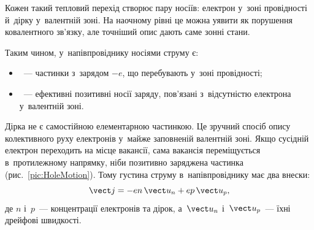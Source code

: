 
Кожен такий тепловий перехід створює пару носіїв: електрон у~зоні провідності й~дірку
у~валентній зоні. На наочному рівні це можна уявити як порушення ковалентного зв'язку,
але точніший опис дають саме зонні стани.

Таким чином, у~напівпровіднику носіями струму є:
\begin{itemize}
	\item {}~--- частинки з~зарядом $-e$, що перебувають у~зоні
	  провідності;
	\item {}~--- ефективні позитивні носії заряду, пов'язані з~відсутністю
	  електрона у~валентній зоні.
\end{itemize}

Дірка не є самостійною елементарною частинкою. Це зручний спосіб опису колективного руху
електронів у~майже заповненій валентній зоні. Якщо сусідній електрон переходить на місце
вакансії, сама вакансія переміщується в~протилежному напрямку, ніби позитивно заряджена
частинка (рис.~\ref{pic:HoleMotion}). Тому густина струму в~напівпровіднику має два
внески:
\begin{equation}\label{eq:SemiconductorCurrent}
	\vect j =
	-e n\,\vect u_n
	+e p\,\vect u_p,
\end{equation}
де $n$ і~$p$~--- концентрації електронів та дірок, а~$\vect u_n$ і~$\vect u_p$~--- їхні
дрейфові швидкості.

